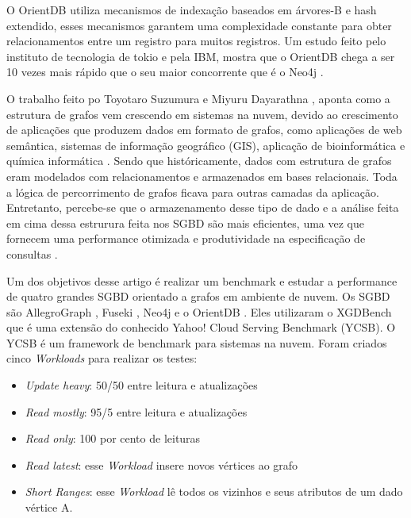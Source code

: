 	O OrientDB utiliza mecanismos de indexação baseados em árvores-B e hash extendido, esses mecanismos garantem uma complexidade constante para obter relacionamentos entre um registro para muitos registros. Um estudo feito pelo instituto de tecnologia de tokio e pela IBM, mostra que o OrientDB chega a ser 10 vezes mais rápido que o seu maior concorrente que é o Neo4j \cite{dayarathna2012xgdbench}.
	
	O trabalho feito po Toyotaro Suzumura e Miyuru Dayarathna \cite{dayarathna2012xgdbench}, aponta como a estrutura de grafos vem crescendo em sistemas na nuvem, devido ao crescimento de aplicações que produzem dados em formato de grafos, como aplicações de web semântica, sistemas de informação geográfico (GIS), aplicação de bioinformática \cite{dudley2010translational} e química informática \cite{ekins2010chemical}. Sendo que históricamente, dados com estrutura de grafos eram modelados com relacionamentos e armazenados em bases relacionais. Toda a lógica de percorrimento de grafos ficava para outras camadas da aplicação. Entretanto, percebe-se que o armazenamento desse tipo de dado e a análise feita em cima dessa estrurura feita nos SGBD são mais eficientes, uma vez que fornecem uma performance otimizada e produtividade na especificação de consultas \cite{dayarathna2012xgdbench}.
	
	Um dos objetivos desse artigo \cite{dayarathna2012xgdbench} é realizar um benchmark e estudar a performance de quatro grandes SGBD orientado a grafos em ambiente de nuvem. Os SGBD são AllegroGraph \cite{allegro}, Fuseki \cite{fuseki}, Neo4j \cite{neo4j-site} e o OrientDB \cite{orientdb-site}. Eles utilizaram o XGDBench que é uma extensão do conhecido Yahoo! Cloud Serving Benchmark (YCSB). O YCSB é um framework de benchmark para sistemas na nuvem. Foram criados cinco \textit{Workloads} para realizar os testes:

\begin{itemize}
	\item  \textit{Update heavy}: 50/50 entre leitura e atualizações
	\item  \textit{Read mostly}: 95/5 entre leitura e atualizações
	\item  \textit{Read only}: 100 por cento de leituras
	\item  \textit{Read latest}: esse \textit{Workload} insere novos vértices ao grafo
	\item  \textit{Short Ranges}: esse \textit{Workload} lê todos os vizinhos e seus atributos de um dado vértice A.
\end{itemize}


